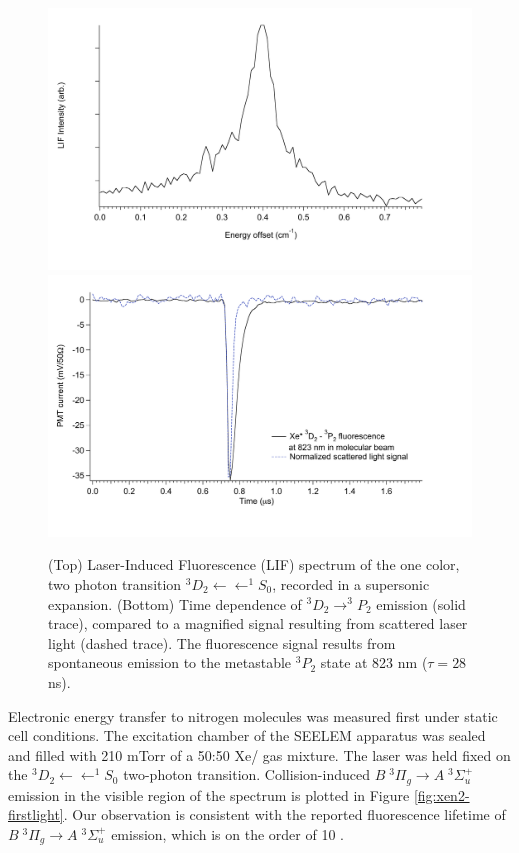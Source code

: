 \begin{figure}
  \caption{(Top) Laser-Induced Fluorescence (LIF) spectrum of the one
    color, two photon transition  $^3D_2 \leftarrow \leftarrow
    ^1S_0$, recorded in a supersonic expansion.  (Bottom) Time
    dependence of  $^3D_2 \rightarrow ^3P_2$ emission (solid
    trace), compared to a magnified signal resulting from scattered
    laser light (dashed trace). The fluorescence signal results from
    spontaneous emission to the metastable $^3P_2$ state at 823 nm
    ($\tau = 28$ ns).}
  \label{fig:xe-beam}
  \centering
  \includegraphics[width=6in]{Xe-beamlif-060406-int.pdf}
  \includegraphics[width=6in]{Xe-beamtrc-060406.pdf}
\end{figure}

Electronic energy transfer to nitrogen molecules was measured first
under static cell conditions.  The excitation chamber of the SEELEM
apparatus was sealed and filled with 210 mTorr of a 50:50 Xe/
gas mixture.  The laser was held fixed on the  $^3D_2
\leftarrow \leftarrow ^1S_0$ two-photon transition.  Collision-induced
 $B \; ^3\Pi_g \rightarrow A \; ^3\Sigma_u^+$ emission in the visible
region of the spectrum is plotted in Figure \ref{fig:xen2-firstlight}.
Our observation is consistent with the reported fluorescence lifetime
of  $B \; ^3\Pi_g \rightarrow A \; ^3\Sigma_u^+$ emission, which is on the
order of 10 \microsec.


